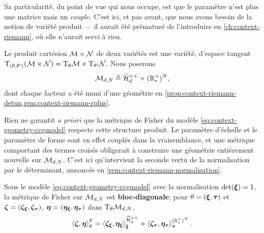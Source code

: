 Sa particularité, du point de vue qui nous occupe, est que le paramètre n'est plus une matrice mais un \emph{couple}. C'est ici, et pas avant, que nous avons besoin de la notion de variété produit --- il aurait été prématuré de l'introduire en \cref{ch:context-riemann}, où elle n'aurait servi à rien.

\begin{definition}
\label{def:context-geometry-produit}
  Le produit cartésien $\mathcal{M}\times\mathcal{N}$ de deux variétés est une variété, d'espace tangent $\mathrm{T}_{(\theta,\theta')}(\mathcal{M}\times\mathcal{N})=\mathrm{T}_{\theta}\mathcal{M}\times\mathrm{T}_{\theta'}\mathcal{N}$. Nous poserons
  \begin{equation}
    \mathcal{M}_{d,N}
    \triangleq
    \widetilde{\mathcal{H}}_{d}^{++}\times(\mathbb{R}_*^+)^{N},
    \label{eq:context-geometry-varieteccg}
  \end{equation}
  dont chaque facteur a été muni d'une géométrie en \cref{prop:context-riemann-detun,rem:context-riemann-rplus}.
\end{definition}

Rien ne garantit \emph{a priori} que la métrique de Fisher du modèle \cref{eq:context-geometry-ccgmodel} respecte cette structure produit. Le paramètre d'échelle et le paramètre de forme sont en effet couplés dans la vraisemblance, et une métrique comportant des termes croisés obligerait à construire une géométrie entièrement nouvelle sur $\mathcal{M}_{d,N}$. C'est ici qu'intervient la seconde vertu de la normalisation par le déterminant, annoncée en \cref{rem:context-riemann-normalisation}.

\begin{proposition}
\label{prop:context-geometry-fisherccg}
  Sous le modèle \cref{eq:context-geometry-ccgmodel} avec la normalisation $\operatorname{\operatorname{det}}(\boldsymbol{\xi})=1$, la métrique de Fisher sur $\mathcal{M}_{d,N}$ est \textbf{bloc-diagonale}: pour $\theta=(\boldsymbol{\xi},\boldsymbol{\tau})$ et $\boldsymbol{\zeta}=(\boldsymbol{\zeta}_{\boldsymbol{\xi}},\boldsymbol{\zeta}_{\boldsymbol{\tau}})$, $\boldsymbol{\eta}=(\boldsymbol{\eta}_{\boldsymbol{\xi}},\boldsymbol{\eta}_{\boldsymbol{\tau}})$ dans $\mathrm{T}_{\theta}\mathcal{M}_{d,N}$,
  \begin{equation}
    \left\langle \boldsymbol{\zeta}, \boldsymbol{\eta} \right\rangle_{\theta}^{\mathrm{F}}
    =
    \left\langle \boldsymbol{\zeta}_{\boldsymbol{\xi}}, \boldsymbol{\eta}_{\boldsymbol{\xi}} \right\rangle_{\boldsymbol{\xi}}^{\widetilde{\mathcal{H}}_{d}^{++}}
    +
    \left\langle \boldsymbol{\zeta}_{\boldsymbol{\tau}}, \boldsymbol{\eta}_{\boldsymbol{\tau}} \right\rangle_{\boldsymbol{\tau}}^{(\mathbb{R}_*^+)^{N}}.
    \label{eq:context-geometry-metriqueccg}
  \end{equation}
\end{proposition}

